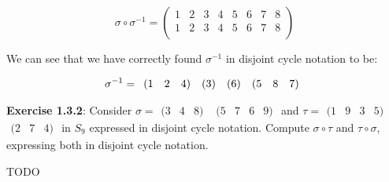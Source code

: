 \documentclass[a4paper]{article}
\begin{document}
\begin{myparindent}{0pt}
\[
    \sigma \circ \sigma^{-1} =
  \begin{pmatrix}
      1 & 2 & 3 & 4 & 5 & 6 & 7 & 8 \\
      1 & 2 & 3 & 4 & 5 & 6 & 7 & 8 \\
  \end{pmatrix}
\]

We can see that we have correctly found $\sigma^{-1}$ in disjoint cycle notation to be:

\[
    \noindent \sigma^{-1} = \begin{array}{rrr} (1 & 2 & 4) \end{array}
    \noindent \begin{array}{r} (3) \end{array}
    \noindent \begin{array}{r} (6) \end{array}
    \noindent \begin{array}{rrr} (5 & 8 & 7) \end{array}
\]

\textbf{Exercise 1.3.2}:
\noindent Consider $\sigma = \begin{array}{rrr} (3 & 4 & 8) \end{array}$  $\begin{array}{rrrr} (5 & 7 & 6 & 9) \end{array}$
and $\tau = \begin{array}{rrrr} (1 & 9 & 3 & 5) \end{array}$ $\begin{array}{rrrr} (2 & 7 & 4) \end{array}$
in $S_9$ expressed in disjoint cycle notation.
Compute $\sigma \circ \tau$ and $\tau \circ \sigma$, expressing both in disjoint cycle notation. \newline

TODO \newline

\end{myparindent}
\end{document}
